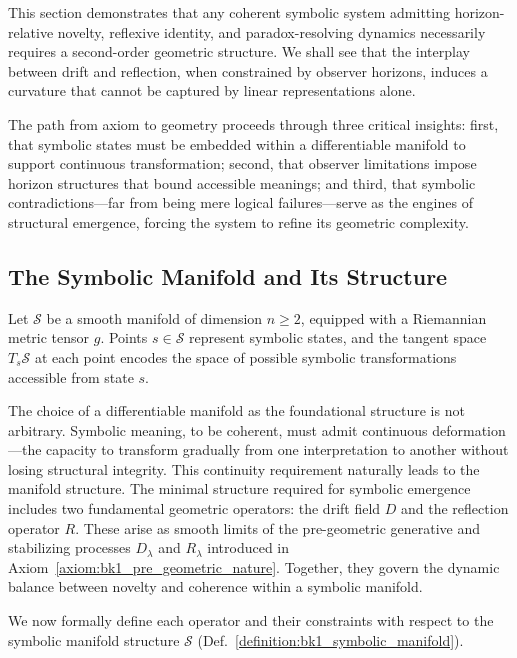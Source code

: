 This section demonstrates that any coherent symbolic system admitting horizon-relative novelty, reflexive identity, and paradox-resolving dynamics necessarily requires a second-order geometric structure. We shall see that the interplay between drift and reflection, when constrained by observer horizons, induces a curvature that cannot be captured by linear representations alone.

The path from axiom to geometry proceeds through three critical insights: first, that symbolic states must be embedded within a differentiable manifold to support continuous transformation; second, that observer limitations impose horizon structures that bound accessible meanings; and third, that symbolic contradictions—far from being mere logical failures—serve as the engines of structural emergence, forcing the system to refine its geometric complexity.

\subsection{The Symbolic Manifold and Its Structure}
\label{subsec:bk1_symbolic_manifold_structure}

\begin{definition}
\label{definition:bk1_symbolic_manifold}
Let $\mathcal{S}$ be a smooth manifold of dimension $n \geq 2$, equipped with a Riemannian metric tensor $g$. Points $s \in \mathcal{S}$ represent symbolic states, and the tangent space $T_s\mathcal{S}$ at each point encodes the space of possible symbolic transformations accessible from state $s$.
\end{definition}

The choice of a differentiable manifold as the foundational structure is not arbitrary. Symbolic meaning, to be coherent, must admit continuous deformation—the capacity to transform gradually from one interpretation to another without losing structural integrity. This continuity requirement naturally leads to the manifold structure.
The minimal structure required for symbolic emergence includes two fundamental geometric operators: the drift field \( D \) and the reflection operator \( R \). These arise as smooth limits of the pre-geometric generative and stabilizing processes \( D_\lambda \) and \( R_\lambda \) introduced in Axiom~\ref{axiom:bk1_pre_geometric_nature}. Together, they govern the dynamic balance between novelty and coherence within a symbolic manifold.

We now formally define each operator and their constraints with respect to the symbolic manifold structure \( \mathcal{S} \) (Def.~\ref{definition:bk1_symbolic_manifold}).


